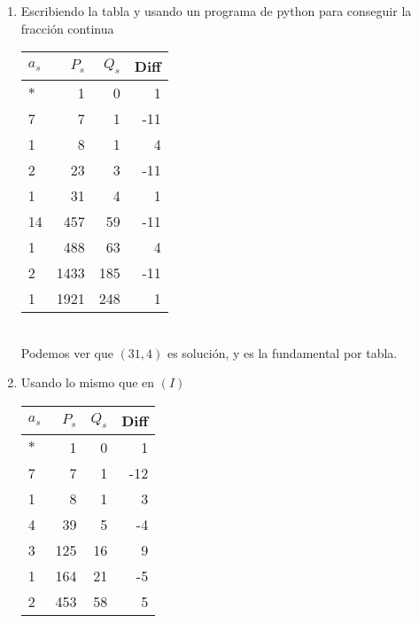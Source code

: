 \begin{sol}
	\begin{enumerate}[label = (\roman*)]
		\item Escribiendo la tabla y usando un programa de python \citep{prog} para conseguir la fracción continua\\
		      \begin{tabular}{| l | r | r | r |}
			      \hline
			      $a_s$ & $P_s$ & $Q_s$ & Diff \\
			      \hline\hline
			      $*$   & 1     & 0     & 1    \\
			      \hline
			      7     & 7     & 1     & -11  \\
			      \hline
			      1     & 8     & 1     & 4    \\
			      \hline
			      2     & 23    & 3     & -11  \\
			      \hline
			      1     & 31    & 4     & 1    \\
			      \hline
			      14    & 457   & 59    & -11  \\
			      \hline
			      1     & 488   & 63    & 4    \\
			      \hline
			      2     & 1433  & 185   & -11  \\
			      \hline
			      1     & 1921  & 248   & 1    \\
			      \hline
		      \end{tabular}\\
		      Podemos ver que $(31,4)$ es solución, y es la fundamental por tabla.
		\item Usando lo mismo que en $(I)$\\
		      \begin{tabular}{| l | r | r | r |}
			      \hline
			      $a_s$ & $P_s$      & $Q_s$     & Diff \\
			      \hline\hline
			      $*$   & 1          & 0         & 1    \\
			      \hline
			      7     & 7          & 1         & -12  \\
			      \hline
			      1     & 8          & 1         & 3    \\
			      \hline
			      4     & 39         & 5         & -4   \\
			      \hline
			      3     & 125        & 16        & 9    \\
			      \hline
			      1     & 164        & 21        & -5   \\
			      \hline
			      2     & 453        & 58        & 5    \\

\end{tabular}
\end{enumerate}
\end{sol}

